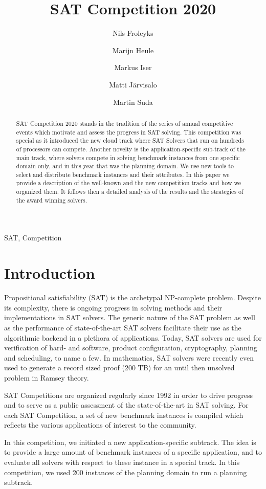 \documentclass{elsarticle}
\title{SAT Competition 2020\tnoteref{title}}
\author[jku]{Nils Froleyks}
\author[cmu]{Marijn Heule}
\author[kit]{Markus Iser}
\author[hiit]{Matti Järvisalo}
\author[ctu]{Martin Suda}
\begin{document}
\begin{abstract}
SAT Competition 2020 stands in the tradition of the series of annual competitive events which motivate and assess the progress in SAT solving. 
This competition was special as it introduced the new cloud track where SAT Solvers that run on hundreds of processors can compete. 
Another novelty is the application-specific sub-track of the main track, where solvers compete in solving benchmark instances from one specific domain only, and in this year that was the planning domain. 
We use new tools to select and distribute benchmark instances and their attributes. 
In this paper we provide a description of the well-known and the new competition tracks and how we organized them. 
It follows then a detailed analysis of the results and the strategies of the award winning solvers. 
\end{abstract}

\begin{keyword}
SAT, Competition
\end{keyword}

\maketitle

\section{Introduction}

Propositional satisfiability (SAT) is the archetypal NP-complete problem. 
Despite its complexity, there is ongoing progress in solving methods and their implementations in SAT solvers. 
The generic nature of the SAT problem as well as the performance of state-of-the-art SAT solvers facilitate their use as the algorithmic backend in a plethora of applications. 
Today, SAT solvers are used for verification of hard- and software, product configuration, cryptography, planning and scheduling, to name a few. 
In mathematics, SAT solvers were recently even used to generate a record sized proof (200 TB) for an until then unsolved problem in Ramsey theory. 

SAT Competitions are organized regularly since 1992 in order to drive progress and to serve as a public assessment of the state-of-the-art in SAT solving. 
For each SAT Competition, a set of new benchmark instances is compiled which reflects the various applications of interest to the community. 

In this competition, we initiated a new application-specific subtrack. 
The idea is to provide a large amount of benchmark instances of a specific application, and to evaluate all solvers with respect to these instance in a special track. 
In this competition, we used 200 instances of the planning domain to run a planning subtrack. 
\end{document}
